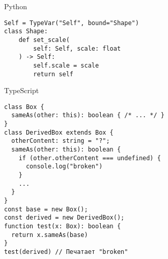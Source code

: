 \documentclass[handout,aspectratio=169,usenames,dvipsnames]{beamer}
\begin{document}
\begin{frame}[fragile]{Python}
                \begin{verbatim}
Self = TypeVar("Self", bound="Shape")
class Shape:
    def set_scale(
        self: Self, scale: float
    ) -> Self:
        self.scale = scale
        return self
                \end{verbatim}
\end{frame}

\begin{frame}[fragile]{TypeScript}
                \begin{verbatim}
class Box {
  sameAs(other: this): boolean { /* ... */ }
}
class DerivedBox extends Box {
  otherContent: string = "?";
  sameAs(other: this): boolean {
    if (other.otherContent === undefined) {
      console.log("broken")
    }
    ...
  }
}
const base = new Box();
const derived = new DerivedBox();
function test(x: Box): boolean {
  return x.sameAs(base)
}
test(derived) // Печатает "broken"
                \end{verbatim}
\end{frame}
\end{document}
